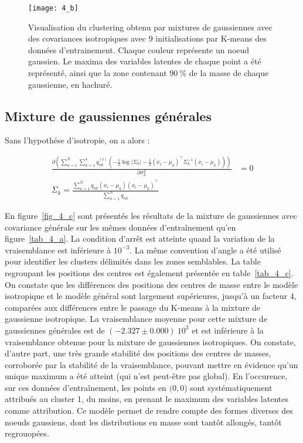 \documentclass[12pt,a4paper,onecolumn]{article}
\begin{document}
\begin{figure}[H]
	\centering
	\texttt{[image: 4\_b]}
	\caption{Visualisation du clustering obtenu par mixtures de gaussiennes avec des covariances isotropiques avec 9 initialisations par K-means des données d'entrainement. Chaque couleur représente un noeud gaussien. Le maxima des variables latentes de chaque point a été représenté, ainsi que la zone contenant \(90~\%\) de la masse de chaque gaussienne, en hachuré.}
	\label{fig_4_b}
\end{figure}


\subsection{Mixture de gaussiennes générales}

Sans l'hypothése d'isotropie, on a alors :

\begin{equation}
	\begin{split}
		\frac{\partial\left(\sum_{n = 1}^N\sum_{k = 1}^4q_{nk}^{(t)}\left(
		-\frac{1}{2}\log|\Sigma_k|-\frac{1}{2}\left(x_i - \mu_k\right)^{\intercal}\Sigma_k^{-1}\left(x_i - \mu_k\right)\right)\right)}{\partial\sigma_k^2} &= 0\\
		\Sigma_k = \frac{\sum_{n = 1}^Nq_{nk}\left(x_i-\mu_k\right)\left(x_i-\mu_k\right)^{\intercal}}{\sum_{n = 1}^Nq_{nk}}
	\end{split}
\end{equation}

En figure~\ref{fig_4_c} sont présentés les résultats de la mixture de gaussiennes avec covariance générale sur les mêmes données d'entraînement qu'en figure~\ref{tab_4_a}. La condition d'arrêt est atteinte quand la variation de la vraisemblance est inférieure à \(10^{-3}\). La même convention d'angle a été utilisé pour identifier les clusters délimités dans les zones semblables. La table regroupant les positions des centres est également présentée en table~\ref{tab_4_c}. On constate que les différences des positions des centres de masse entre le modèle isotropique et le modèle général sont largement supérieures, jusqu'à un facteur 4, comparées aux différences entre le passage du K-means à la mixture de gaussienne isotropique. La vraisemblance moyenne pour cette mixture de gaussiennes générales est de \((-2.327\pm0.000)~10^3\) et est inférieure à la vraisemblance obtenue pour la mixture de gaussiennes isotropiques. On constate, d'autre part, une très grande stabilité des positions des centres de masses, corroborée par la stabilité de la vraisemblance, pouvant mettre en évidence qu'un unique maximum a été atteint (qui n'est peut-être pas global). En l'occurence, sur ces données d'entraînement, les points en \((0,0\)) sont systématiquement attribués au cluster 1, du moins, en prenant le maximum des variables latentes comme attribution. Ce modèle permet de rendre compte des formes diverses des noeuds gaussiens, dont les distributions en masse sont tantôt allongés, tantôt regrouopées.
\end{document}

